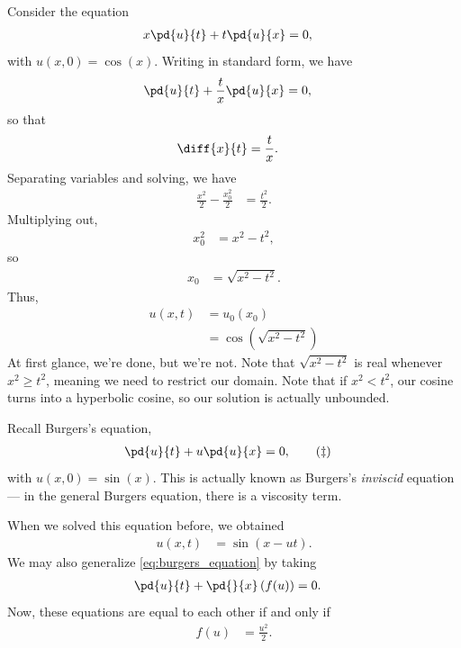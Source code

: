 \documentclass[10pt]{mypackage}
\begin{document}
\begin{example}
  Consider the equation
  \begin{align*}
    x\pd{u}{t} + t\pd{u}{x} &= 0,
  \end{align*}
  with $u\left( x,0 \right) = \cos\left( x \right)$. Writing in standard form, we have
  \begin{align*}
    \pd{u}{t} + \frac{t}{x} \pd{u}{x} &= 0,
  \end{align*}
  so that
  \begin{align*}
    \diff{x}{t} &= \frac{t}{x}.
  \end{align*}
  Separating variables and solving, we have
  \begin{align*}
    \frac{x^2}{2} - \frac{x_0^2}{2} &= \frac{t^2}{2}.
  \end{align*}
  Multiplying out,
  \begin{align*}
    x_0^2 &= x^2 - t^2,
  \end{align*}
  so
  \begin{align*}
    x_0 &= \sqrt{x^2 - t^2}.
  \end{align*}
  Thus,
  \begin{align*}
    u\left( x,t \right) &= u_0\left( x_0 \right)\\
                        &= \cos\left( \sqrt{x^2 - t^2} \right)
  \end{align*}
  At first glance, we're done, but we're not. Note that $\sqrt{x^2 - t^2}$ is real whenever $x^2 \geq t^2$, meaning we need to restrict our domain. Note that if $x^2 < t^2$, our cosine turns into a hyperbolic cosine, so our solution is actually unbounded.
\end{example}
\begin{example}
  Recall Burgers's equation,
  \begin{align*}
    \pd{u}{t} + u \pd{u}{x} &= 0,\label{eq:burgers_equation}\tag{$\ddag$}
  \end{align*}
  with $u\left( x,0 \right) = \sin\left( x \right)$. This is actually known as Burgers's \textit{inviscid} equation --- in the general Burgers equation, there is a viscosity term.\newline

  When we solved this equation before, we obtained
  \begin{align*}
    u\left( x,t \right) &= \sin\left( x-u t \right).
  \end{align*}
  We may also generalize \eqref{eq:burgers_equation} by taking
  \begin{align*}
    \pd{u}{t} + \pd{}{x}\left( f(u) \right) &= 0.
  \end{align*}
  Now, these equations are equal to each other if and only if
  \begin{align*}
    f(u) &= \frac{u^2}{2}.
  \end{align*}
\end{example}
\end{document}
